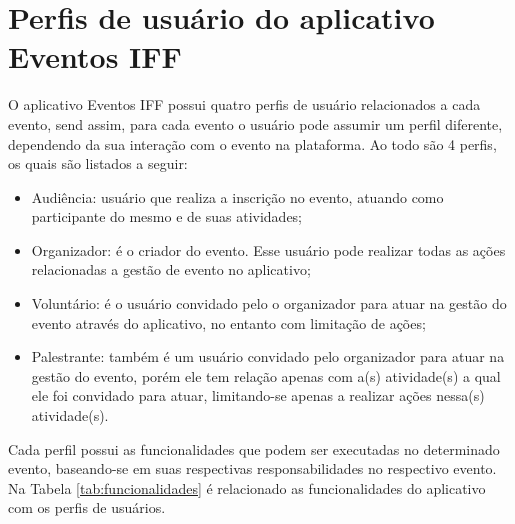 \section{Perfis de usuário do aplicativo Eventos IFF}

O aplicativo Eventos IFF possui quatro perfis de usuário relacionados a cada evento, send assim, para cada evento o usuário pode assumir um perfil diferente, dependendo da sua interação com o evento na plataforma. Ao todo são 4 perfis, os quais são listados a seguir:

\begin{itemize}
    \item Audiência: usuário que realiza a inscrição no evento, atuando como participante do mesmo e de suas atividades;
    \item Organizador: é o criador do evento. Esse usuário pode realizar todas as ações relacionadas a gestão de evento no aplicativo;
    \item Voluntário: é o usuário convidado pelo o organizador para atuar na gestão do evento através do aplicativo, no entanto com limitação de ações;
    \item Palestrante: também é um usuário convidado pelo organizador para atuar na gestão do evento, porém ele tem relação apenas com a(s) atividade(s) a qual ele foi convidado para atuar, limitando-se apenas a realizar ações nessa(s) atividade(s).
\end{itemize}

Cada perfil possui as funcionalidades que podem ser executadas no determinado evento, baseando-se em suas respectivas responsabilidades no respectivo evento. Na Tabela \ref{tab:funcionalidades} é relacionado as funcionalidades do aplicativo com os perfis de usuários.

